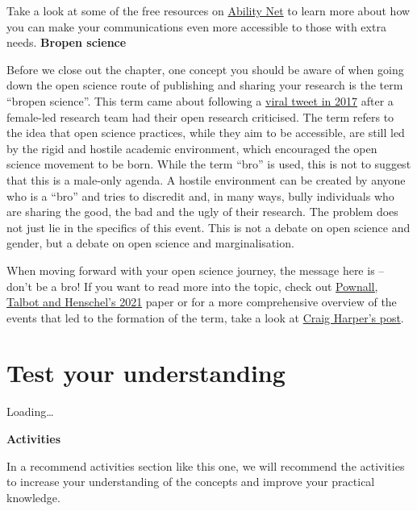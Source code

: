 \documentclass[
]{book}
\begin{document}
Take a look at some of the free resources on \href{https://abilitynet.org.uk/free-resources/abilitynet-factsheets}{Ability Net} to learn more about how you can make your communications even more accessible to those with extra needs. \textbf{Bropen science}

Before we close out the chapter, one concept you should be aware of when going down the open science route of publishing and sharing your research is the term ``bropen science''. This term came about following a \href{https://www.bps.org.uk/psychologist/bropenscience-broken-science}{viral tweet in 2017} after a female-led research team had their open research criticised. The term refers to the idea that open science practices, while they aim to be accessible, are still led by the rigid and hostile academic environment, which encouraged the open science movement to be born. While the term ``bro'' is used, this is not to suggest that this is a male-only agenda. A hostile environment can be created by anyone who is a ``bro'' and tries to discredit and, in many ways, bully individuals who are sharing the good, the bad and the ugly of their research. The problem does not just lie in the specifics of this event. This is not a debate on open science and gender, but a debate on open science and marginalisation.

When moving forward with your open science journey, the message here is -- don't be a bro! If you want to read more into the topic, check out \href{https://journals.sagepub.com/doi/full/10.1177/03616843211029255}{Pownall, Talbot and Henschel's 2021} paper or for a more comprehensive overview of the events that led to the formation of the term, take a look at \href{https://craigharper.substack.com/p/bropen-science?s=r}{Craig Harper's post}.

\hypertarget{test-your-understanding-8}{%
\section{Test your understanding}\label{test-your-understanding-8}}

Loading\ldots{}

\textbf{Activities}

In a recommend activities section like this one, we will recommend the activities to increase your understanding of the concepts and improve your practical knowledge.
\end{document}

